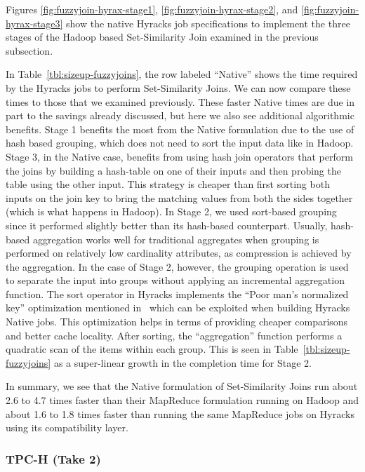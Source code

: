 Figures \ref{fig:fuzzyjoin-hyrax-stage1}, \ref{fig:fuzzyjoin-hyrax-stage2}, and \ref{fig:fuzzyjoin-hyrax-stage3} show the native Hyracks job specifications to
implement the three stages of the Hadoop based Set-Similarity Join examined in the previous subsection.

In Table~\ref{tbl:sizeup-fuzzyjoins}, the row labeled ``Native'' shows the time
required by the Hyracks jobs to perform Set-Similarity Joins. We can now compare these
times to those that we examined previously. These faster Native times are due in part to the savings
already discussed, but here we also see additional algorithmic benefits. Stage 1 benefits the most
from the Native formulation due to the use of hash based grouping, which does not need
to sort the input data like in Hadoop. Stage 3, in the Native case, benefits from using
hash join operators that perform the joins by building a hash-table on one of their inputs
and then probing the table using the other input. This strategy is cheaper than first
sorting both inputs on the join key to bring the matching values from both the sides
together (which is what happens in Hadoop). In Stage 2, we used sort-based grouping since it performed
slightly better than its hash-based counterpart. Usually, hash-based aggregation works well
for traditional aggregates when grouping is performed on relatively low cardinality attributes, as
compression is achieved by the aggregation. In the case of Stage 2, however, the grouping
operation is used to separate the input into groups without applying an incremental aggregation function.
The sort operator in Hyracks implements the ``Poor man's normalized key'' optimization mentioned
in~\cite{GraefeCPUCache} which can be exploited when building Hyracks Native jobs.
This optimization helps in terms of providing cheaper comparisons and better cache locality.  
After sorting, the ``aggregation'' function performs a quadratic scan of the items
within each group. This is seen in Table~\ref{tbl:sizeup-fuzzyjoins} as a super-linear growth in the completion time for Stage 2.

In summary, we see that the Native formulation of Set-Similarity Joins run about 2.6 to 4.7
times faster than their MapReduce formulation running on Hadoop and about 1.6 to 1.8
times faster than running the same MapReduce jobs on Hyracks using its compatibility layer.

\subsubsection{TPC-H (Take 2)}

